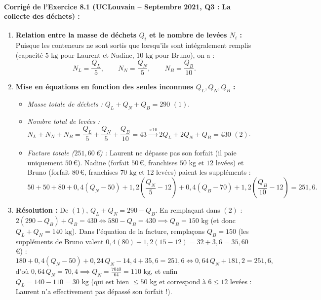 \paragraph{Corrigé de l'Exercice 8.1 (UCLouvain -- Septembre 2021, Q3 : La collecte des déchets) :}
\begin{enumerate}
    \item \textbf{Relation entre la masse de déchets $Q_i$ et le nombre de levées $N_i$ :}
    Puisque les conteneurs ne sont sortis que lorsqu'ils sont intégralement remplis (capacité $5\text{ kg}$ pour Laurent et Nadine, $10\text{ kg}$ pour Bruno), on a :
    \[
        N_L = \frac{Q_L}{5}, \qquad N_N = \frac{Q_N}{5}, \qquad N_B = \frac{Q_B}{10}.
    \]
    \item \textbf{Mise en équations en fonction des seules inconnues $Q_L, Q_N, Q_B$ :}
    \begin{itemize}
        \item \emph{Masse totale de déchets :} $Q_L + Q_N + Q_B = 290$ \quad $(1)$.
        \item \emph{Nombre total de levées :} $N_L + N_N + N_B = \dfrac{Q_L}{5} + \dfrac{Q_N}{5} + \dfrac{Q_B}{10} = 43 \xrightarrow{\times 10} 2Q_L + 2Q_N + Q_B = 430$ \quad $(2)$.
        \item \emph{Facture totale ($251,60$\,€) :} Laurent ne dépasse pas son forfait (il paie uniquement $50$\,€). Nadine (forfait $50$\,€, franchises $50\text{ kg}$ et $12$ levées) et Bruno (forfait $80$\,€, franchises $70\text{ kg}$ et $12$ levées) paient les suppléments :
        \[
            50 + 50 + 80 + 0,4(Q_N - 50) + 1,2\left(\frac{Q_N}{5} - 12\right) + 0,4(Q_B - 70) + 1,2\left(\frac{Q_B}{10} - 12\right) = 251,6.
        \]
    \end{itemize}
    \item \textbf{Résolution :}
    De $(1)$, $Q_L + Q_N = 290 - Q_B$. En remplaçant dans $(2)$ : $2(290 - Q_B) + Q_B = 430 \iff 580 - Q_B = 430 \implies \boxed{Q_B = 150\text{ kg}}$ (et donc $Q_L + Q_N = 140\text{ kg}$).
    Dans l'équation de la facture, remplaçons $Q_B = 150$ (les suppléments de Bruno valent $0,4(80) + 1,2(15 - 12) = 32 + 3,6 = 35,60$\,€) :
    \[
        180 + 0,4(Q_N - 50) + 0,24\,Q_N - 14,4 + 35,6 = 251,6 \iff 0,64\,Q_N + 181,2 = 251,6,
    \]
    d'où $0,64\,Q_N = 70,4 \implies \boxed{Q_N = \frac{7040}{64} = 110\text{ kg}}$,
    et enfin $Q_L = 140 - 110 = \boxed{30\text{ kg}}$ (qui est bien $\le 50\text{ kg}$ et correspond à $6 \le 12$ levées : Laurent n'a effectivement pas dépassé son forfait !).
\end{enumerate}

